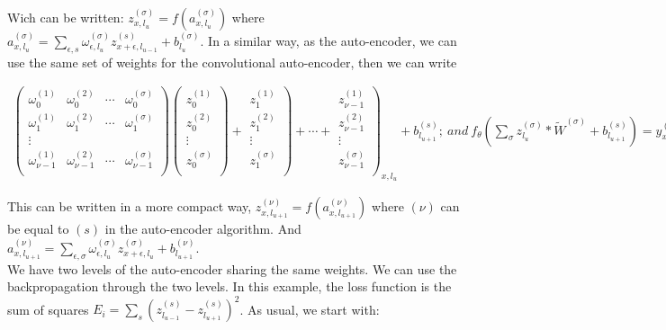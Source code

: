 \documentclass[final, paper=letter,5p,times,twocolumn]{elsarticle}
\begin{document}
Wich can be written: $z_{x,l_{u}}^{(\sigma)} = f(a_{x,l_{u}}^{(\sigma)})$ where $a_{x,l_{u}}^{(\sigma)} = \sum_{\epsilon,s} \omega_{\epsilon,l_{u}}^{(\sigma)}z_{x+\epsilon,l_{u-1}}^{(s)} + b_{l_{u}}^{(\sigma)}$. In a similar way, as the auto-encoder, we can use the same set of weights for the convolutional auto-encoder, then we can write


\begin{strip}
  \begin{eqnarray*}
      \left(
      \begin{array}{cccc}
        \omega_{0}^{(1)} & \omega_{0}^{(2)} & \cdots & \omega_{0}^{(\sigma)} \\
        \omega_{1}^{(1)} & \omega_{1}^{(2)} & \cdots & \omega_{1}^{(\sigma)} \\
        \vdots \\
        \omega_{\nu-1}^{(1)} & \omega_{\nu-1}^{(2)} & \cdots & \omega_{\nu-1}^{(\sigma)} \\
      \end{array}
      \right) \left(
      \begin{array}{c}
        z_{0}^{(1)} \\
        z_{0}^{(2)} \\
        \vdots \\
        z_{0}^{(\sigma)} \\
      \end{array}
      \right) + \left. 
      \begin{array}{c}
        z_{1}^{(1)} \\
        z_{1}^{(2)} \\
        \vdots \\
        z_{1}^{(\sigma)} \\
      \end{array}
      \right) + \cdots + \left. 
      \begin{array}{c}
        z_{\nu-1}^{(1)} \\
        z_{\nu-1}^{(2)} \\
        \vdots \\
        z_{\nu-1}^{(\sigma)} \\
      \end{array}
      \right)_{x,l_{u}} + b_{l_{u+1}}^{(s)};~and~f_{\theta}\left(\sum_{\sigma} z_{l_{u}}^{(\sigma)}*\tilde{W}^{(\sigma)} + b_{l_{u+1}}^{(s)} \right) = y_{x,l_{u+1}}^{(s)}
  \end{eqnarray*}
\end{strip}

This can be written in a more compact way, $z_{x,l_{u+1}}^{(\nu)} = f(a_{x,l_{u+1}}^{(\nu)})$ where $(\nu)$ can be equal to $(s)$ in the auto-encoder algorithm. And $a_{x,l_{u+1}}^{(\nu)} = \sum_{\epsilon,\sigma} \omega_{\epsilon,l_{u}}^{(\sigma)}z_{x+\epsilon,l_{u}}^{(\sigma)} + b_{l_{u+1}}^{(\nu)}$. \\
We have two levels of the auto-encoder sharing the same weights. We can use the backpropagation through the two levels. In this example, the loss function is the sum of squares $E_{i} = \sum_{s} (z_{l_{u-1}}^{(s)} - z_{l_{u+1}}^{(s)})^{2}$. As usual, we start with:
\end{document}

